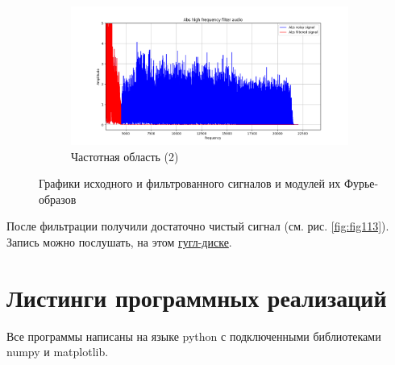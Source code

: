 \documentclass[a4paper, 12pt]{article}
\begin{document}
\begin{figure}[H]
\begin{subfigure}{0.45\textwidth}
            \centering
            \includegraphics[width=\linewidth]{abs_audio_2.png}
            \caption{Частотная область (2)}
            \label{fig:fig1142}
        \end{subfigure}
        \caption{Графики исходного и фильтрованного сигналов и модулей их Фурье-образов}
        \label{fig:timefreq}
    \end{figure}

    
    После фильтрации получили достаточно чистый сигнал (см. рис. \ref{fig:fig113}). Запись можно послушать,
    на этом \href{https://drive.google.com/drive/folders/1AuXIiKRWvXFOtJqV3uqPzC494zZ7vCrd?usp=sharing}{гугл-диске}.

    
    \section{Листинги программных реализаций}
    Все программы написаны на языке python с подключенными библиотеками numpy и matplotlib.
\end{document}
